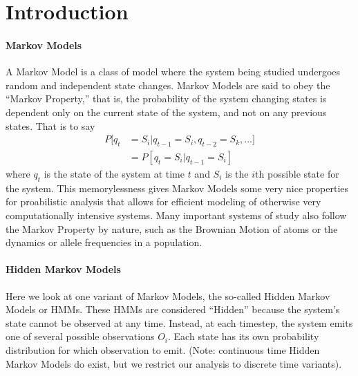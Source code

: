 \section{Introduction} \label{sec:intro}



\paragraph{Markov Models}
A Markov Model is a class of model where the system being studied undergoes random and independent state changes. Markov Models are said to obey the ``Markov Property,'' that is, the probability of the system changing states is dependent only on the current state of the system, and not on any previous states. That is to say 
    \begin{align*}
      P[q_t &= S_i | q_{t-1} = S_i, q_{t-2} = S_k, ...]\\
      &= P[q_t = S_i | q_{t-1} = S_i]
    \end{align*}
where $q_t$ is the state of the system at time $t$ and $S_i$ is the $i$th possible state for the system. This memorylessness gives Markov Models some very nice properties for proabilistic analysis that allows for efficient modeling of otherwise very computationally intensive systems. Many important systems of study also follow the Markov Property by nature, such as the Brownian Motion of atoms or the dynamics or allele frequencies in a population. 

\paragraph{Hidden Markov Models}
Here we look at one variant of Markov Models, the so-called Hidden Markov Models or HMMs. These HMMs are considered ``Hidden'' because the system's state cannot be observed at any time. Instead, at each timestep, the system emits one of several possible observations $O_i$. Each state has its own probability distribution for which observation to emit. (Note: continuous time Hidden Markov Models do exist, but we restrict our analysis to discrete time variants). 

